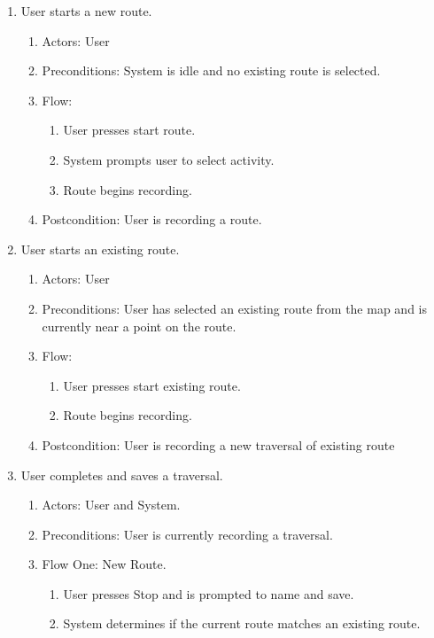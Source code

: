 ﻿\documentclass{article}
\begin{document}
\begin{enumerate}
\item User starts a new route.
    \begin{enumerate}
        \item Actors: User
        \item Preconditions: System is idle and no existing route is selected.
        \item Flow:
            \begin{enumerate}
                \item User presses start route.
                \item System prompts user to select activity.
                \item Route begins recording.
            \end{enumerate}
        \item Postcondition: User is recording a route.
    \end{enumerate}
\item User starts an existing route.
    \begin{enumerate}
        \item Actors: User
        \item Preconditions: User has selected an existing route from the map and is currently near       a point on the route.
        \item Flow:
            \begin{enumerate}
                \item User presses start existing route.
                \item Route begins recording.
            \end{enumerate}
        \item Postcondition: User is recording a new traversal of existing route
    \end{enumerate}
\item User completes and saves a traversal.
    \begin{enumerate}
        \item Actors: User and System.
        \item Preconditions: User is currently recording a traversal.
        \item Flow One: New Route.
            \begin{enumerate}
            \item User presses Stop and is prompted to name and save.
            \item System determines if the current route matches an existing route.

\end{enumerate}
\end{enumerate}
\end{enumerate}
\end{document}
